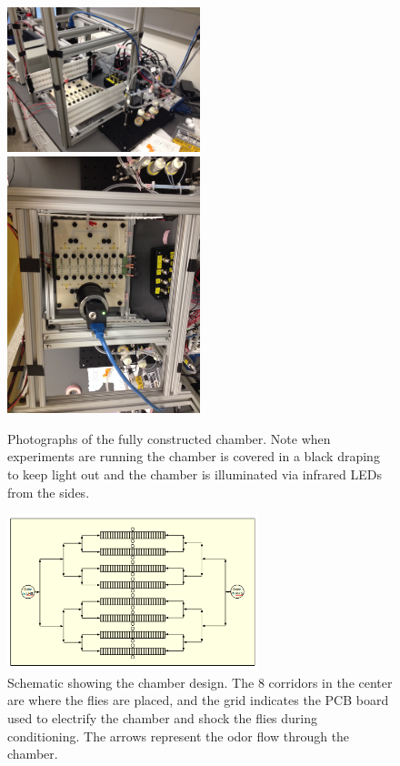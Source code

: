 \documentclass{article}
\begin{document}
\begin{figure}[h]
\begin{center}
\includegraphics[width=0.5\textwidth]{Figures/chamber1}
\includegraphics[width=0.5\textwidth]{Figures/chamber2}
\caption{Photographs of the fully constructed chamber. Note when experiments are running the chamber is covered in a black draping to keep light out and the chamber is illuminated via infrared LEDs from the sides.}
\end{center}
\end{figure}

\begin{figure}[h]
\begin{center}
\includegraphics[width=0.65\textwidth]{Figures/chamber_schematic}
\caption{Schematic showing the chamber design. The 8 corridors in the center are where the flies are placed, and the grid indicates the PCB board used to electrify the chamber and shock the flies during conditioning. The arrows represent the odor flow through the chamber.}
\end{center}
\end{figure}
\end{document}
